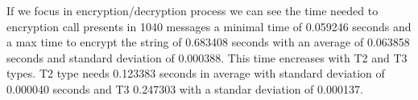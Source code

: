 \documentclass[journal,twoside]{JoPhA}
\begin{document}
If we focus in encryption/decryption process we can see the time needed to encryption call presents in 1040 messages 
a minimal time of 0.059246 seconds and a  max time to encrypt the string of  0.683408 seconds with an average of 0.063858 seconds and standard deviation of 0.000388.
This time encreases with T2 and T3 types. T2 type needs 0.123383 seconds in average with standard deviation of 0.000040 seconds and  T3  0.247303 with a standar deviation of 0.000137.






% 
% 
\end{document}
